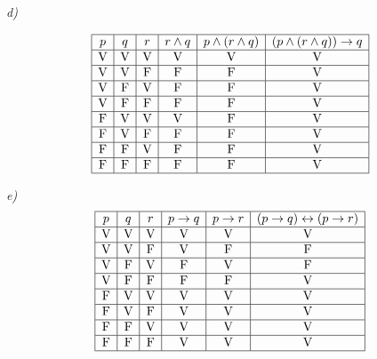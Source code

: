 \textit{d) }

\[
\begin{array}{|c|c|c|c|c|c|c|}
\hline
p & q & r & r  \land q & p \land (r \land q) & (p \land (r \land q )) \to q\\
\hline
\text{V} & \text{V} & \text{V} & \text{V}&\text{V} & \text{V} \\
\hline
\text{V} & \text{V} & \text{F} & \text{F} & \text{F} & \text{V}\\
\hline
\text{V} & \text{F} & \text{V} & \text{F} & \text{F} & \text{V} \\
\hline
\text{V} & \text{F} & \text{F} & \text{F} & \text{F} & \text{V}\\
\hline
\text{F} & \text{V} & \text{V} & \text{V} & \text{F} & \text{V}\\
\hline
\text{F} & \text{V} & \text{F} & \text{F} & \text{F} & \text{V}\\
\hline
\text{F} & \text{F} & \text{V} & \text{F} & \text{F} & \text{V}\\
\hline
\text{F} & \text{F} & \text{F} & \text{F} & \text{F} & \text{V}\\
\hline
\end{array}
\]

\textit{e) }
\[
\begin{array}{|c|c|c|c|c|c|}
\hline
p & q & r & p \rightarrow q & p \rightarrow r & (p \rightarrow q) \leftrightarrow (p \rightarrow r) \\
\hline
\text{V} & \text{V} & \text{V} & \text{V} & \text{V} & \text{V} \\
\hline
\text{V} & \text{V} & \text{F} & \text{V} & \text{F} & \text{F} \\
\hline
\text{V} & \text{F} & \text{V} & \text{F} & \text{V} & \text{F} \\
\hline
\text{V} & \text{F} & \text{F} & \text{F} & \text{F} & \text{V} \\
\hline
\text{F} & \text{V} & \text{V} & \text{V} & \text{V} & \text{V} \\
\hline
\text{F} & \text{V} & \text{F} & \text{V} & \text{V} & \text{V} \\
\hline
\text{F} & \text{F} & \text{V} & \text{V} & \text{V} & \text{V} \\
\hline
\text{F} & \text{F} & \text{F} & \text{V} & \text{V} & \text{V} \\
\hline
\end{array}
\]